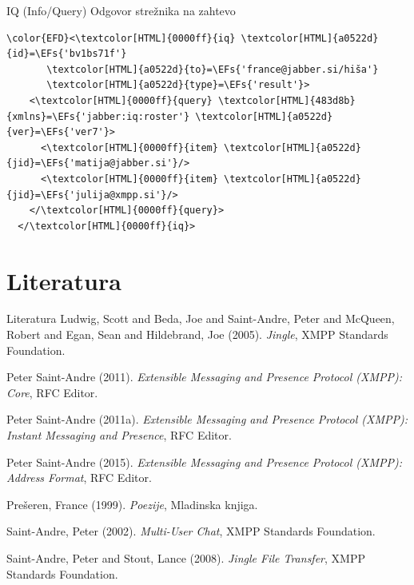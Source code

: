 \documentclass[presentation]{beamer}
\newcommand{\EFs}[1]{\textcolor{EFs}{#1}} %
\begin{document}
\begin{frame}[label={sec:org34c80f1},fragile]{IQ (Info/Query)}
 Odgovor strežnika na zahtevo

\begin{Code}
\begin{Verbatim}
\color{EFD}<\textcolor[HTML]{0000ff}{iq} \textcolor[HTML]{a0522d}{id}=\EFs{'bv1bs71f'}
       \textcolor[HTML]{a0522d}{to}=\EFs{'france@jabber.si/hiša'}
       \textcolor[HTML]{a0522d}{type}=\EFs{'result'}>
    <\textcolor[HTML]{0000ff}{query} \textcolor[HTML]{483d8b}{xmlns}=\EFs{'jabber:iq:roster'} \textcolor[HTML]{a0522d}{ver}=\EFs{'ver7'}>
      <\textcolor[HTML]{0000ff}{item} \textcolor[HTML]{a0522d}{jid}=\EFs{'matija@jabber.si'}/>
      <\textcolor[HTML]{0000ff}{item} \textcolor[HTML]{a0522d}{jid}=\EFs{'julija@xmpp.si'}/>
    </\textcolor[HTML]{0000ff}{query}>
  </\textcolor[HTML]{0000ff}{iq}>
\end{Verbatim}
\end{Code}
\end{frame}

\section{Literatura}
\label{sec:orgd5e69b1}

\begin{frame}[label={sec:org1498403}]{Literatura}
\noindent
Ludwig, Scott and Beda, Joe and Saint-Andre, Peter and McQueen, Robert and Egan, Sean and Hildebrand, Joe (2005). \emph{Jingle}, XMPP Standards Foundation.

\noindent
Peter Saint-Andre (2011). \emph{{Extensible Messaging and Presence Protocol (XMPP): Core}}, RFC Editor.

\noindent
Peter Saint-Andre (2011a). \emph{{Extensible Messaging and Presence Protocol (XMPP): Instant Messaging and Presence}}, RFC Editor.

\noindent
Peter Saint-Andre (2015). \emph{{Extensible Messaging and Presence Protocol (XMPP): Address Format}}, RFC Editor.

\noindent
Prešeren, France (1999). \emph{Poezije}, Mladinska knjiga.

\noindent
Saint-Andre, Peter (2002). \emph{Multi-User Chat}, XMPP Standards Foundation.

\noindent
Saint-Andre, Peter and Stout, Lance (2008). \emph{Jingle File Transfer}, XMPP Standards Foundation.
\end{frame}
\end{document}
